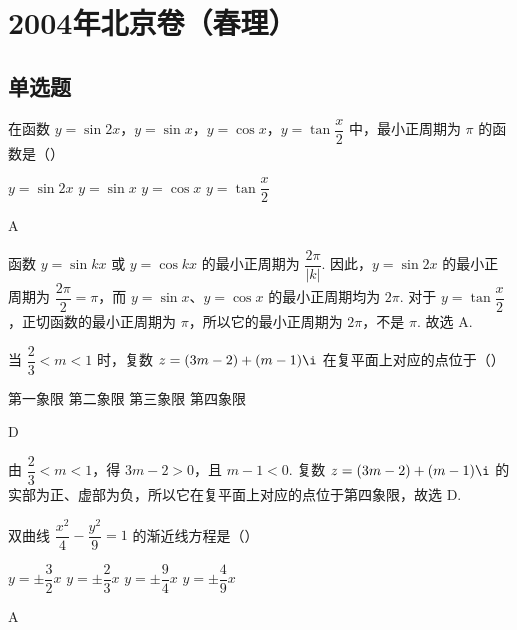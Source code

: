 \chapter{2004年北京卷（春理）}
\section{单选题}
\begin{problem}
在函数 \(y=\sin 2x\)，\(y=\sin x\)，\(y=\cos x\)，\(y=\tan \dfrac{x}{2}\) 中，最小正周期为 \(\pi\) 的函数是（\quad）

\choices
    {\(y=\sin 2x\)}
    {\(y=\sin x\)}
    {\(y=\cos x\)}
    {\(y=\tan \dfrac{x}{2}\)}
\end{problem}

\begin{answer}
A
\end{answer}

\begin{solution}
函数 \(y=\sin kx\) 或 \(y=\cos kx\) 的最小正周期为 \(\dfrac{2\pi}{|k|}\). 因此，\(y=\sin 2x\) 的最小正周期为 \(\dfrac{2\pi}{2}=\pi\)，而 \(y=\sin x\)、\(y=\cos x\) 的最小正周期均为 \(2\pi\). 对于 \(y=\tan\dfrac{x}{2}\)，正切函数的最小正周期为 \(\pi\)，所以它的最小正周期为 \(2\pi\)，不是 \(\pi\). 故选 A.
\end{solution}

\begin{problem}
当 \(\dfrac{2}{3}<m<1\) 时，复数 \(z=(3m-2)+(m-1)\i\) 在复平面上对应的点位于（\quad）

\choices
    {第一象限}
    {第二象限}
    {第三象限}
    {第四象限}
\end{problem}

\begin{answer}
D
\end{answer}

\begin{solution}
由 \(\dfrac{2}{3}<m<1\)，得 \(3m-2>0\)，且 \(m-1<0\). 复数 \(z=(3m-2)+(m-1)\i\) 的实部为正、虚部为负，所以它在复平面上对应的点位于第四象限，故选 D.
\end{solution}

\begin{problem}
双曲线 \(\dfrac{x^2}{4}-\dfrac{y^2}{9}=1\) 的渐近线方程是（\quad）

\choices
    {\(y=\pm\dfrac{3}{2}x\)}
    {\(y=\pm\dfrac{2}{3}x\)}
    {\(y=\pm\dfrac{9}{4}x\)}
    {\(y=\pm\dfrac{4}{9}x\)}
\end{problem}

\begin{answer}
A
\end{answer}

